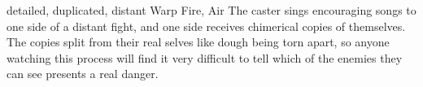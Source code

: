   {detailed, duplicated, distant}%
  {Warp}%
  {Fire, Air}%
  {}%
  {The caster sings encouraging songs to one side of a distant fight, and one side receives chimerical copies of themselves.}%
  {The copies split from their real selves like dough being torn apart, so anyone watching this process will find it very difficult to tell which of the enemies they can see presents a real danger.}

